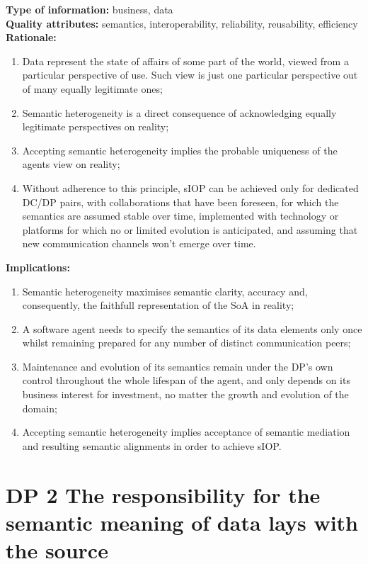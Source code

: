 \documentclass[sort&compress,preprint,authoryear,3p,twocolumn]{elsarticle}
\begin{document}
\begin{mmdp}\label{dp:shf}

\textbf{Type of information:} business, data  \\
\textbf{Quality attributes:} semantics, interoperability, reliability, reusability, efficiency   \\
\textbf{Rationale:}
\begin{enumerate}
  \item Data represent the state of affairs of some part of the world, viewed from a particular perspective of use. Such view is just one particular perspective out of many equally legitimate ones;
  \item Semantic heterogeneity is a direct consequence of acknowledging equally legitimate perspectives on reality;
  \item Accepting semantic heterogeneity implies the probable uniqueness of the agents view on reality;
  \item Without adherence to this principle, sIOP can be achieved only for dedicated DC/DP pairs, with collaborations that have been foreseen, for which the semantics are assumed stable over time, implemented with technology or platforms for which no or limited evolution is anticipated, and assuming that new communication channels won’t emerge over time.
\end{enumerate}
\textbf{Implications:}
\begin{enumerate}
  \item Semantic heterogeneity maximises semantic clarity, accuracy and, consequently, the faithfull representation of the SoA in reality;
  \item A software agent needs to specify the semantics of its data elements only once whilst remaining prepared for any number of distinct communication peers;
  \item Maintenance and evolution of its semantics remain under the DP’s own control throughout the whole lifespan of the agent, and only depends on its business interest for investment, no matter the growth and evolution of the domain;
  \item Accepting semantic heterogeneity implies acceptance of semantic mediation and resulting semantic alignments in order to achieve sIOP.
\end{enumerate}  
\end{mmdp}

\hypertarget{dp-2-the-responsibility-for-the-semantic-meaning-of-data-lays-with-the-source}{%
\section{DP 2 The responsibility for the semantic meaning of data lays
with the
source}\label{dp-2-the-responsibility-for-the-semantic-meaning-of-data-lays-with-the-source}}
\end{document}
